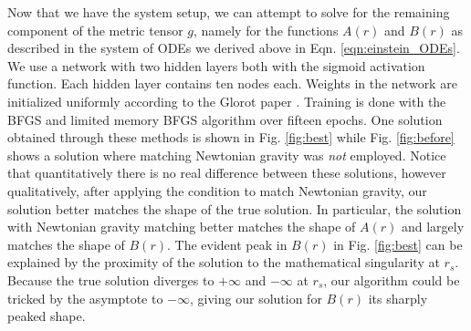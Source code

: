 \documentclass{CUP-JNL-DTM}%
\theoremstyle{definition}
\numberwithin{equation}{section}
\begin{document}
Now that we have the system setup, we can attempt to solve for the remaining component of the metric tensor $g$, namely for the functions $A(r)$ and $B(r)$ as described in the system of ODEs we derived above in Eqn. \ref{eqn:einstein_ODEs}. We use a network with two hidden layers both with the sigmoid activation function. Each hidden layer contains ten nodes each. Weights in the network are initialized uniformly according to the Glorot paper \cite{glorotUnderstandingDifficultyTraining2010}. Training is done with the BFGS and limited memory BFGS algorithm \cite{liuLimitedMemoryBFGS1989} over fifteen epochs. One solution obtained through these methods is shown in Fig. \ref{fig:best} while Fig. \ref{fig:before} shows a solution where matching Newtonian gravity was \emph{not} employed. Notice that quantitatively there is no real difference between these solutions, however qualitatively, after applying the condition to match Newtonian gravity, our solution better matches the shape of the true solution. In particular, the solution with Newtonian gravity matching better matches the shape of $A(r)$ and largely matches the shape of $B(r)$. The evident peak in $B(r)$ in Fig. \ref{fig:best} can be explained by the proximity of the solution to the mathematical singularity at $r_s$. Because the true solution diverges to $+\infty$ and $-\infty$ at $r_s$, our algorithm could be tricked by the asymptote to $-\infty$, giving our solution for $B(r)$ its sharply peaked shape. 
\end{document}

